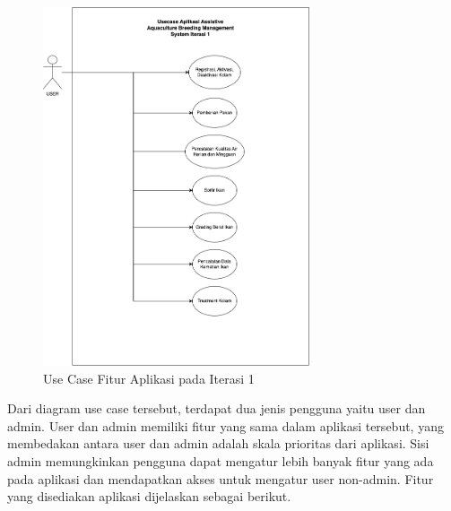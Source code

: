 \begin{figure}[H]
	\centering
	\includegraphics[width=0.7\textwidth]{gambar/akbar/usecase_iterasi_1.png}
	\caption{Use Case Fitur Aplikasi pada Iterasi 1}
\end{figure}

Dari diagram use case tersebut, terdapat dua jenis pengguna yaitu user dan admin. User dan admin memiliki fitur yang sama dalam aplikasi tersebut, yang membedakan antara user dan admin adalah skala prioritas dari aplikasi. Sisi admin memungkinkan pengguna dapat mengatur lebih banyak fitur yang ada pada aplikasi dan mendapatkan akses untuk mengatur user non-admin. Fitur yang disediakan aplikasi dijelaskan sebagai berikut.

